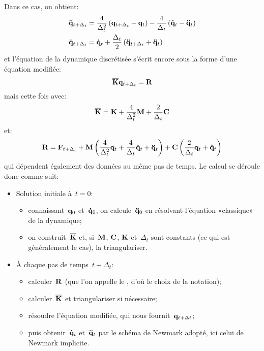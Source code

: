 Dans ce cas, on obtient:
\begin{equation}
\begin{aligned}
&\VV{\ddot q}_{t+\Delta_t} = \frac4{\Delta_t^2} \left( \VV{q}_{t+\Delta_t} -\VV{q}_t\right)
-\frac4{\Delta_t}\left( \VV{\dot q}_t - \VV{\ddot q}_t\right)\\
&\VV{\dot q}_{t+\Delta_t} = \VV{\dot q}_t + \frac{\Delta_t}2\left( \VV{\ddot q}_{t+\Delta_t} + \VV{\ddot q}_t\right)
\end{aligned}
\end{equation}
et l'équation de la dynamique discrétisée s'écrit encore sous la forme d'une équation modifiée:
\begin{equation}
\MM{\overline{K}} \VV{q}_{t+\Delta_t} = \VV{R}
\end{equation}
mais cette fois avec:
\begin{equation}
\MM{\overline{K}} = \MM{K}+\frac4{\Delta_t^2}\MM{M}+\frac2{\Delta_t}\MM{C}
\end{equation}
et:
\begin{equation}
\VV{R} = \VV{F}_{t+\Delta_t} + \MM{M}\left(\frac4{\Delta_t^2}\VV{q}_t + \frac4{\Delta_t}\VV{\dot q}_t
+ \VV{\ddot q}_t\right)
+\MM{C}\left( \frac2{\Delta_t}\VV{q}_t + \VV{\dot q}_t\right)
\end{equation}
qui dépendent également des données au même pas de temps.
\medskip
Le calcul se déroule donc comme suit:
\begin{itemize}
  \item Solution initiale à~$t=0$:
	\begin{itemize}
	\item connaissant~$\VV{q}_0$ et~$\VV{\dot q}_0$, on calcule~$\VV{\ddot q}_0$ en résolvant
	l'équation «classique» de la dynamique;
	\item on construit~$\MM{\overline{K}}$ et, si~$\MM{M}$, $\MM{C}$, $\MM{K}$ et~$\Delta_t$ sont constants
	(ce qui est généralement le cas), la triangulariser.
	\end{itemize}
  \item À chaque pas de temps~$t+\Delta_t$:
	\begin{itemize}
	\item calculer~$\VV{R}$ (que l'on appelle le , d'où le choix de la notation);
	\item calculer~$\MM{\overline{K}}$ et triangulariser si nécessaire;
	\item résoudre l'équation modifiée, qui nous fournit~$\VV{q}_{t+\Delta t}$;
	\item puis obtenir~$\VV{\dot q}_t$ et~$\VV{\ddot q}_t$ par le schéma de Newmark adopté,
	ici celui de Newmark implicite.
	\end{itemize}
\end{itemize}
